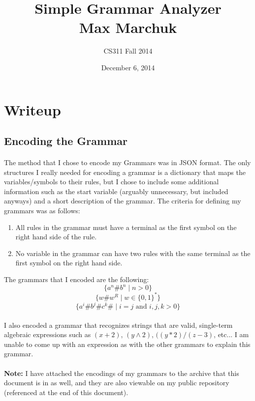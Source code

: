 \documentclass[11pt]{article}
\title{Simple Grammar Analyzer \\ Max Marchuk}
\author{CS311 Fall 2014}
\date{December 6, 2014}
\begin{document}
\maketitle

\section*{Writeup}

\subsection*{Encoding the Grammar}
\paragraph{}The method that I chose to encode my Grammars was in JSON format. The only structures I really needed for encoding a grammar is a dictionary that maps the variables/symbols to their rules, but I chose to include some additional information such as the start variable (arguably unnecessary, but included anyways) and a short description of the grammar. The criteria for defining my grammars was as follows:
\begin{enumerate}
        \item All rules in the grammar must have a terminal as the first 
        symbol on the right hand side of the rule.
        \item No variable in the grammar can have two rules with the same terminal
        as the first symbol on the right hand side.
    \end{enumerate}
The grammars that I encoded are the following: 
    \[ \{ a^n\#b^n \;|\; n > 0 \} \]
    \[ \{ w\#w^R \;|\; w \in \{0,1\}^* \} \]
    \[ \{ a^i\#b^j\#c^k\# \;|\; i = j \text{ and } i,j,k > 0 \} \]
\paragraph{}I also encoded a grammar that recognizes strings that are valid, single-term algebraic expressions such as $(x+2)$, $(y\wedge2)$, $((y*2)/(z-3)$, etc... I am unable to come up with an expression as with the other grammars to explain this grammar.
\paragraph{}\textbf{Note: }I have attached the encodings of my grammars to the archive that this document is in as well, and they are also viewable on my public repository (referenced at the end of this document).
    
\end{document}
